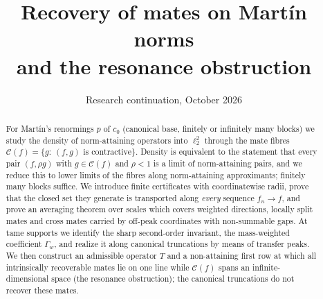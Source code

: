\documentclass[10pt]{amsart}
\title{Recovery of mates on Mart\'in norms\\and the resonance obstruction}
\author{}
\date{Research continuation, October 2026}
\theoremstyle{definition}
\theoremstyle{remark}
\newcommand{\Cset}{\mathcal C}
\begin{document}
\begin{abstract}
For Mart\'in's renormings $p$ of $c_0$ (canonical base, finitely or
infinitely many blocks) we study the density of norm-attaining operators
into $\ell_2^2$ through the mate fibres
$\Cset(f)=\{g:\ (f,g)\text{ is contractive}\}$.  Density is equivalent to the
statement that every pair $(f,\rho g)$ with $g\in\Cset(f)$ and $\rho<1$ is a
limit of norm-attaining pairs, and we reduce this to lower limits of the
fibres along norm-attaining approximants; finitely many blocks suffice.  We
introduce finite certificates with coordinatewise radii, prove that the
closed set they generate is transported along \emph{every} sequence
$f_n\to f$, and prove an averaging theorem over scales which covers weighted
directions, locally split mates and cross mates carried by off-peak
coordinates with non-summable gaps.  At tame supports we identify the sharp
second-order invariant, the mass-weighted coefficient $\Gamma_w$, and
realize it along canonical truncations by means of transfer peaks.  We then
construct an admissible operator $T$ and a non-attaining first row at which
all intrinsically recoverable mates lie on one line while $\Cset(f)$ spans an
infinite-dimensional space (the resonance obstruction); the canonical
truncations do not recover these mates.


\end{abstract}
\end{document}
